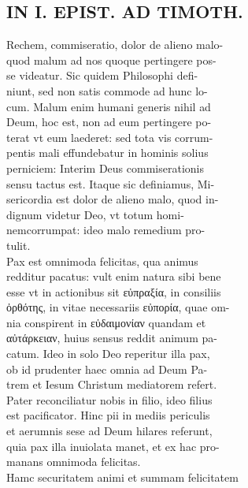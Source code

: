 \documentclass{article}
\begin{document}
\begin{pages}
\section*{IN I. EPIST. AD TIMOTH. \\
                }
Rechem, commiseratio, dolor de alieno malo- \\
                quod malum ad nos quoque pertingere pos- \\
                se videatur. Sic quidem Philosophi defi- \\
                niunt, sed non satis commode ad hunc lo- \\
                cum. Malum enim humani generis nihil ad \\
                Deum, hoc est, non ad eum pertingere po- \\
                terat vt eum laederet: sed tota vis corrum- \\
                pentis mali effundebatur in hominis solius \\
                perniciem: Interim Deus commiserationis \\
                sensu tactus est. Itaque sic definiamus, Mi- \\
                sericordia est dolor de alieno malo, quod in- \\
                dignum videtur Deo, vt totum homi- \\
                nemcorrumpat: ideo malo remedium pro- \\
                tulit. \\
                Pax est omnimoda felicitas, qua animus \\
                redditur pacatus: vult enim natura sibi bene \\
                esse vt in actionibus sit εὐπραξία, in consiliis \\
                ὀρθότης, in vitae necessariis εὐπορία, quae om- \\
                nia conspirent in εὐδαιμονίαν quandam et \\
                αὐτάρκειαν, huius sensus reddit animum pa- \\
                catum. Ideo in solo Deo reperitur illa pax, \\
                ob id prudenter haec omnia ad Deum Pa- \\
                trem et Iesum Christum mediatorem refert. \\
                Pater reconciliatur nobis in filio, ideo filius \\
                est pacificator. Hinc pii in mediis periculis \\
                et aerumnis sese ad Deum hilares referunt, \\
                quia pax illa inuiolata manet, et ex hac pro- \\
                manans omnimoda felicitas. \\
                Hamc securitatem animi et summam felicitatem \\
                

\end{pages}
\end{document}
